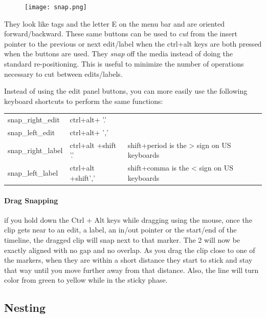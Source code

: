 \begin{figure}
  \vspace{-2ex}
  \centering
  \texttt{[image: snap.png]}
\end{figure}

They look like tags and the letter E on the menu bar and are
oriented forward/backward.  These same buttons can be used to
\textit{cut} from the insert pointer to the previous or next
edit/label when the ctrl+alt keys are both pressed when the buttons
are used.  They \textit{snap} off the media instead of doing the
standard re-positioning.  This is useful to minimize the number of
operations necessary to cut between edits/labels.

Instead of using the edit panel buttons, you can more easily use the
following keyboard shortcuts to perform the same functions:

\begin{center}
  \begin{tabular}{lll}
    \toprule
    snap\_right\_edit & ctrl+alt+ '.' &\\
        snap\_left\_edit & ctrl+alt+ ',' &\\
    snap\_right\_label & ctrl+alt +shift '.' & shift+period is the > sign on US keyboards\\
    snap\_left\_label &  ctrl+alt +shift',' & shift+comma is the < sign on US keyboards\\
    \bottomrule
  \end{tabular}
\end{center}

\paragraph{Drag Snapping} if you hold down the Ctrl + Alt keys while
dragging using the mouse, once the clip gets near to an edit, a
label, an in/out pointer or the start/end of the timeline, the
dragged clip will snap next to that marker.  The 2 will now be
exactly aligned with no gap and no overlap.  As you drag the clip
close to one of the markers, when they are within a short distance
they start to stick and stay that way until you move further away
from that distance.  Also, the line will turn color from green to
yellow while in the sticky phase.


\subsection{Nesting}%
\label{sub:nesting}

